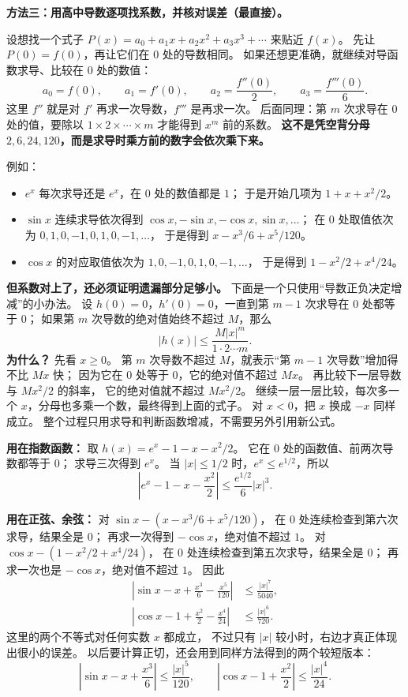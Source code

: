 \begin{proofbox}
\textbf{方法三：用高中导数逐项找系数，并核对误差（最直接）。}
\begin{center}\end{center}

设想找一个式子 $P(x)=a_0+a_1x+a_2x^2+a_3x^3+\cdots$ 来贴近 $f(x)$。
先让 $P(0)=f(0)$，再让它们在 $0$ 处的导数相同。
如果还想更准确，就继续对导函数求导、比较在 $0$ 处的数值：
\[
 a_0=f(0),\qquad a_1=f'(0),\qquad
 a_2=\frac{f''(0)}2,\qquad a_3=\frac{f'''(0)}6.
\]
这里 $f''$ 就是对 $f'$ 再求一次导数，$f'''$ 是再求一次。
后面同理：第 $m$ 次求导在 $0$ 处的值，要除以
$1\times2\times\cdots\times m$ 才能得到 $x^m$ 前的系数。
\textbf{这不是凭空背分母 $2,6,24,120$，而是求导时乘方前的数字会依次乘下来。}

例如：
\begin{itemize}[leftmargin=*]
\item $e^x$ 每次求导还是 $e^x$，在 $0$ 处的数值都是 $1$；
于是开始几项为 $1+x+x^2/2$。
\item $\sin x$ 连续求导依次得到 $\cos x,-\sin x,-\cos x,\sin x,\ldots$；
在 $0$ 处取值依次为 $0,1,0,-1,0,1,0,-1,\ldots$，
于是得到 $x-x^3/6+x^5/120$。
\item $\cos x$ 的对应取值依次为 $1,0,-1,0,1,0,-1,\ldots$，
于是得到 $1-x^2/2+x^4/24$。
\end{itemize}

\textbf{但系数对上了，还必须证明遗漏部分足够小。}
下面是一个只使用“导数正负决定增减”的小办法。
设 $h(0)=0$，$h'(0)=0$，一直到第 $m-1$ 次求导在 $0$ 处都等于 $0$；
如果第 $m$ 次导数的绝对值始终不超过 $M$，那么
\[
 \boxed{|h(x)|\le\frac{M|x|^m}{1\cdot2\cdots m}}.
\]
\textbf{为什么？} 先看 $x\ge0$。
第 $m$ 次导数不超过 $M$，就表示“第 $m-1$ 次导数”增加得不比 $Mx$ 快；
因为它在 $0$ 处等于 $0$，它的绝对值不超过 $Mx$。
再比较下一层导数与 $Mx^2/2$ 的斜率，
它的绝对值就不超过 $Mx^2/2$。
继续一层一层比较，每次多一个 $x$，分母也多乘一个数，最终得到上面的式子。
对 $x<0$，把 $x$ 换成 $-x$ 同样成立。
整个过程只用求导和判断函数增减，不需要另外引用新公式。

\textbf{用在指数函数：}
取 $h(x)=e^x-1-x-x^2/2$。
它在 $0$ 处的函数值、前两次导数都等于 $0$；
求导三次得到 $e^x$。
当 $|x|\le1/2$ 时，$e^x\le e^{1/2}$，所以
\[
 \boxed{\left|e^x-1-x-\frac{x^2}{2}\right|
 \le\frac{e^{1/2}}6|x|^3}.
\]

\textbf{用在正弦、余弦：}
对 $\sin x-(x-x^3/6+x^5/120)$，
在 $0$ 处连续检查到第六次求导，结果全是 $0$；
再求一次得到 $-\cos x$，绝对值不超过 $1$。
对 $\cos x-(1-x^2/2+x^4/24)$，
在 $0$ 处连续检查到第五次求导，结果全是 $0$；
再求一次也是 $-\cos x$，绝对值不超过 $1$。
因此
\[
 \boxed{\begin{aligned}
 \left|\sin x-x+\frac{x^3}{6}-\frac{x^5}{120}\right|&\le\frac{|x|^7}{5040},\\
 \left|\cos x-1+\frac{x^2}{2}-\frac{x^4}{24}\right|&\le\frac{|x|^6}{720}.
 \end{aligned}}
\]
这里的两个不等式对任何实数 $x$ 都成立，
不过只有 $|x|$ 较小时，右边才真正体现出很小的误差。
以后要计算正切，还会用到同样方法得到的两个较短版本：
\[
 \left|\sin x-x+\frac{x^3}{6}\right|\le\frac{|x|^5}{120},\qquad
 \left|\cos x-1+\frac{x^2}{2}\right|\le\frac{|x|^4}{24}.
\]

\end{proofbox}
